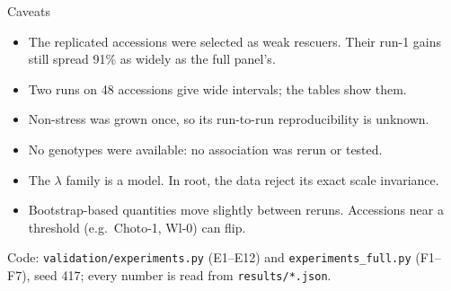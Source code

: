 \documentclass[aspectratio=169,11pt]{beamer}
\begin{document}
\begin{frame}{Caveats}
  \small
  \begin{itemize}
    \item The replicated accessions were selected as weak rescuers. Their run-1 gains still
      spread 91\% as widely as the full panel's.
    \item Two runs on 48 accessions give wide intervals; the tables show them.
    \item Non-stress was grown once, so its run-to-run reproducibility is unknown.
    \item No genotypes were available: no association was rerun or tested.
    \item The $\lambda$ family is a model. In root, the data reject its exact scale
      invariance.
    \item Bootstrap-based quantities move slightly between reruns. Accessions near a
      threshold (e.g.\ Choto-1, Wl-0) can flip.
  \end{itemize}
  \vspace{0.8em}
  \footnotesize Code: \texttt{validation/experiments.py} (E1--E12) and
  \texttt{experiments\_full.py} (F1--F7), seed 417; every number is read from
  \texttt{results/*.json}.
\end{frame}
\end{document}
